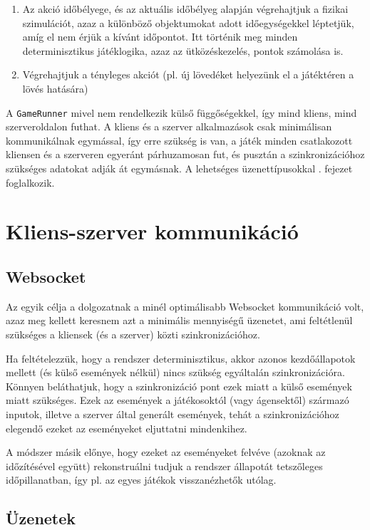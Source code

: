 \begin{itemize}
\begin{enumerate}
  \item Az akció időbélyege, és az aktuális időbélyeg alapján végrehajtjuk a fizikai szimulációt, azaz a különböző objektumokat adott időegységekkel léptetjük, amíg el nem érjük a kívánt időpontot. Itt történik meg minden determinisztikus játéklogika, azaz az ütközéskezelés, pontok számolása is.
  \item Végrehajtjuk a tényleges akciót (pl. új lövedéket helyezünk el a játéktéren a lövés hatására)
\end{enumerate}

A \texttt{GameRunner} mivel nem rendelkezik külső függőségekkel, így mind
kliens, mind szerveroldalon futhat. A kliens és a szerver alkalmazások csak
minimálisan kommunikálnak egymással, így erre szükség is van, a játék minden
csatlakozott kliensen és a szerveren egyeránt párhuzamosan fut, és pusztán a
szinkronizációhoz szükséges adatokat adják át egymásnak. A lehetséges
üzenettípusokkal . fejezet foglalkozik.

\section{Kliens-szerver kommunikáció}

\subsection{Websocket}

Az egyik célja a dolgozatnak a minél optimálisabb Websocket kommunikáció volt,
azaz meg kellett keresnem azt a minimális mennyiségű üzenetet, ami feltétlenül
szükséges a kliensek (és a szerver) közti szinkronizációhoz.

Ha feltételezzük, hogy a rendszer determinisztikus, akkor azonos kezdőállapotok
mellett (és külső események nélkül) nincs szükség egyáltalán szinkronizációra.
Könnyen beláthatjuk, hogy a szinkronizáció pont ezek miatt a külső események
miatt szükséges. Ezek az események a játékosoktól (vagy ágensektől) származó
inputok, illetve a szerver által generált események, tehát a szinkronizációhoz
elegendő ezeket az eseményeket eljuttatni mindenkihez.

A módszer másik előnye, hogy ezeket az eseményeket felvéve (azoknak az
időzítésével együtt) rekonstruálni tudjuk a rendszer állapotát tetszőleges
időpillanatban, így pl. az egyes játékok visszanézhetők utólag.

\subsection{Üzenetek}\label{sec:messages}


\end{itemize}
